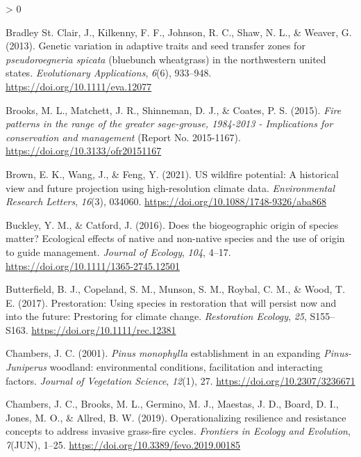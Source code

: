 \documentclass[
  11pt,
  a4paper,
]{article}
\newlength{\cslhangindent}
\newenvironment{CSLReferences}[2] %
 {%
  \setlength{\parindent}{0pt}
  \ifodd #1 \everypar{\setlength{\hangindent}{\cslhangindent}}\ignorespaces\fi
  \ifnum #2 > 0
  \setlength{\parskip}{#2\baselineskip}
  \fi
 }%
 {}
\begin{document}
\begin{CSLReferences}{1}{0}
\leavevmode\hypertarget{ref-bradley_st_clair_genetic_2013}{}%
Bradley St. Clair, J., Kilkenny, F. F., Johnson, R. C., Shaw, N. L., \& Weaver, G. (2013). Genetic variation in adaptive traits and seed transfer zones for \emph{pseudoroegneria spicata} (bluebunch wheatgrass) in the northwestern united states. \emph{Evolutionary Applications}, \emph{6}(6), 933--948. \url{https://doi.org/10.1111/eva.12077}

\leavevmode\hypertarget{ref-Brooks2015}{}%
Brooks, M. L., Matchett, J. R., Shinneman, D. J., \& Coates, P. S. (2015). \emph{Fire patterns in the range of the greater sage-grouse, 1984-2013 - {Implications} for conservation and management} (Report No. 2015-1167). \url{https://doi.org/10.3133/ofr20151167}

\leavevmode\hypertarget{ref-Brown2021}{}%
Brown, E. K., Wang, J., \& Feng, Y. (2021). {US} wildfire potential: A historical view and future projection using high-resolution climate data. \emph{Environmental Research Letters}, \emph{16}(3), 034060. \url{https://doi.org/10.1088/1748-9326/aba868}

\leavevmode\hypertarget{ref-Buckley2016}{}%
Buckley, Y. M., \& Catford, J. (2016). {Does the biogeographic origin of species matter? Ecological effects of native and non-native species and the use of origin to guide management}. \emph{Journal of Ecology}, \emph{104}, 4--17. \url{https://doi.org/10.1111/1365-2745.12501}

\leavevmode\hypertarget{ref-Butterfield2017}{}%
Butterfield, B. J., Copeland, S. M., Munson, S. M., Roybal, C. M., \& Wood, T. E. (2017). Prestoration: Using species in restoration that will persist now and into the future: {Prestoring} for climate change. \emph{Restoration Ecology}, \emph{25}, S155--S163. \url{https://doi.org/10.1111/rec.12381}

\leavevmode\hypertarget{ref-Chambers2001}{}%
Chambers, J. C. (2001). {\emph{Pinus monophylla} establishment in an expanding \emph{Pinus-Juniperus} woodland: environmental conditions, facilitation and interacting factors}. \emph{Journal of Vegetation Science}, \emph{12}(1), 27. \url{https://doi.org/10.2307/3236671}

\leavevmode\hypertarget{ref-Chambers2019}{}%
Chambers, J. C., Brooks, M. L., Germino, M. J., Maestas, J. D., Board, D. I., Jones, M. O., \& Allred, B. W. (2019). {Operationalizing resilience and resistance concepts to address invasive grass-fire cycles}. \emph{Frontiers in Ecology and Evolution}, \emph{7}(JUN), 1--25. \url{https://doi.org/10.3389/fevo.2019.00185}


\end{CSLReferences}
\end{document}
